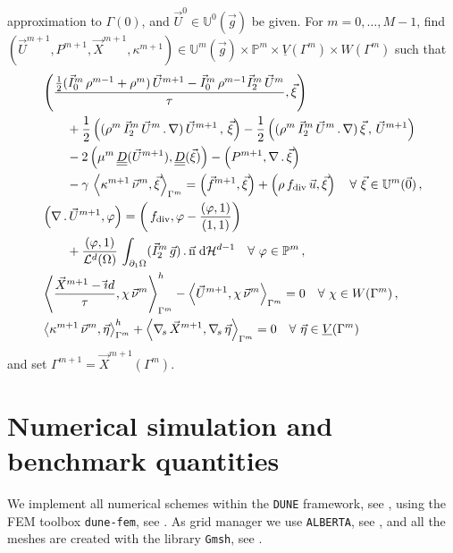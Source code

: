 \documentclass[a4paper,12pt,onecolumn]{article}
\newcommand{\vol}{\mathcal{L}^d}
\newcommand{\dH}[1]{\;{\rm d}{\cal H}^{#1}} %
\newcommand{\Vh}{\underline{V}(\Gamma^m)}
\newcommand{\Wh}{W(\Gamma^m)}
\newcommand{\uspacedisc}[2]{\mathbb{U}^{#2}(\vec{#1})}
\newcommand{\pspace}{\mathbb{P}}
\newcommand{\nabs}{\nabla_{\!s}}
\newcommand{\id}{\rm id}
\newcommand{\unitn}{\vec{\rm n}}
\newcommand{\mat}[1]{\underline{\underline{#1}}\rule{0pt}{0pt}}
\begin{document}
approximation to $\Gamma(0)$, and $\vec U^0\in \uspacedisc{g}{0}$ be given. For
$m=0,\ldots, M-1$, find $(\vec U^{m+1},P^{m+1}, \vec X^{m+1}, \kappa^{m+1}) \in
\uspacedisc{g}{m}\times \pspace^m \times \Vh \times \Wh$ such that
\begin{subequations}
\begin{align}
& \left(\frac{\tfrac{1}{2}(\vec I^m_0\,\rho^{m-1}+\rho^m)\,\vec U^{m+1} -
\vec I^m_0\,\rho^{m-1} \vec I^m_2\,\vec U^m}{\tau}, \vec \xi \right)\nonumber \\
& \qquad + \frac{1}{2}\left((\rho^m\,\vec I^m_2\,\vec U^m\,.\,\nabla)\,
\vec U^{m+1}\,,\,\vec \xi \right) - \frac{1}{2} \left((\rho^m\,
\vec I^m_2 \, \vec U^m\,.\,\nabla)\,\vec \xi\,,\,\vec U^{m+1} \right)
\nonumber \\
& \qquad - 2\left(\mu^m\,\mat D(\vec U^{m+1}), \mat D(\vec \xi) \right)
- \left(P^{m+1}, \nabla\,.\,\vec \xi\right) \nonumber \\
& \qquad - \gamma\,\left\langle
\kappa^{m+1}\,\vec\nu^m,\vec\xi\right\rangle_{\Gamma^m}
= \left(\vec f^{m+1}, \vec \xi\right)
+\left(\rho\,f_{\rm{div}}\,\vec u,\vec\xi\right) \quad \forall\ \vec\xi \in
\uspacedisc{0}{m}\,,\\
& \left(\nabla\,.\,\vec U^{m+1}, \varphi\right)  = \left(\,f_{\rm{div}},
\varphi-\frac{\left(\varphi,1\right)}{\left(1,1\right)}\right) \nonumber \\
& \qquad +\frac{\left(\varphi, 1\right)}{\vol(\Omega)}\, \int_{\partial_1\Omega}
(\vec I^m_2\,\vec g) \,.\, \unitn \dH{d-1}
\quad \forall\ \varphi \in \pspace^m\,, \\
&  \left\langle \frac{\vec X^{m+1} - \vec\id}{\tau} ,\chi\,\vec\nu^m
\right\rangle_{\Gamma^m}^h - \left\langle \vec U^{m+1}, \chi\,\vec\nu^m
\right\rangle_{\Gamma^m}  = 0 \quad \forall\ \chi \in \Wh\,,\\
& \left\langle \kappa^{m+1}\,\vec\nu^m, \vec\eta \right\rangle_{\Gamma^m}^h
+ \left\langle \nabs\,\vec X^{m+1}, \nabs\,\vec \eta \right\rangle_{\Gamma^m} =
0 \quad \forall\ \vec\eta \in \Vh
\end{align}
\end{subequations}
and set $\Gamma^{m+1} = \vec X^{m+1}(\Gamma^m)$.

\section{Numerical simulation and benchmark quantities}
\label{sec:benchmark_quantities}
We implement all numerical schemes within the \verb|DUNE| framework, see
\cite{dunegridpaperI08,dunegridpaperII08}, using the FEM toolbox
\verb|dune-fem|, see \cite{dunefempaper10}. As grid manager we use
\verb|ALBERTA|, see \cite{Alberta}, and all the meshes are created with the
library \verb|Gmsh|, see \cite{GeuzaineR09}.
\end{document}
